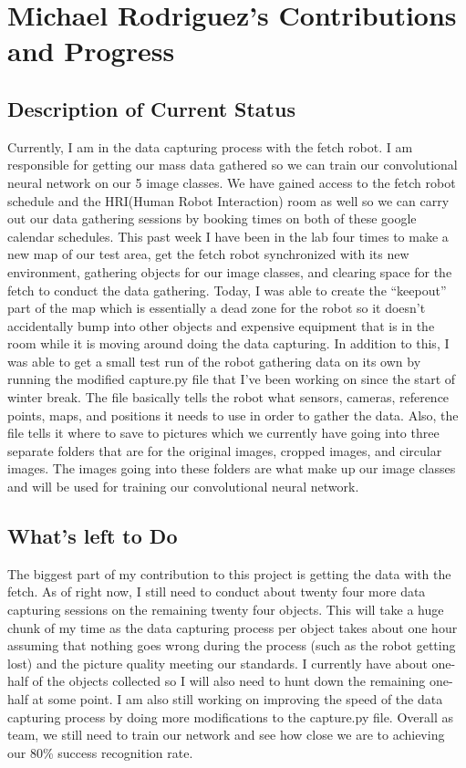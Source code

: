 \documentclass[draftclsnofoot, onecolumn, 10pt, compsoc]{IEEEtran}
\begin{document}
\section{Michael Rodriguez's Contributions and Progress}
\subsection{Description of Current Status}
Currently, I am in the data capturing process with the fetch robot. I am responsible for getting our mass data gathered so we can train our convolutional neural network on our 5 image classes. We have gained access to the fetch robot schedule and the HRI(Human Robot Interaction) room as well so we can carry out our data gathering sessions by booking times on both of these google calendar schedules. This past week I have been in the lab four times to make a new map of our test area, get the fetch robot synchronized with its new environment, gathering objects for our image classes, and clearing space for the fetch to conduct the data gathering. Today, I was able to create the “keepout” part of the map which is essentially a dead zone for the robot so it doesn’t accidentally bump into other objects and expensive equipment that is in the room while it is moving around doing the data capturing. In addition to this, I was able to get a small test run of the robot gathering data on its own by running the modified capture.py file that I’ve been working on since the start of winter break. The file basically tells the robot what sensors, cameras, reference points, maps, and positions it needs to use in order to gather the data. Also, the file tells it where to save to pictures which we currently have going into three separate folders that are for the original images, cropped images, and circular images. The images going into these folders are what make up our image classes and will be used for training our convolutional neural network.
\subsection{What’s left to Do}  
The biggest part of my contribution to this project is getting the data with the fetch. As of right now, I still need to conduct about twenty four more data capturing sessions on the remaining twenty four objects. This will take a huge chunk of my time as the data capturing process per object takes about one hour assuming that nothing goes wrong during the process (such as the robot getting lost) and the picture quality meeting our standards. I currently have about one-half of the objects collected so I will also need to hunt down the remaining one-half at some point. I am also still working on improving the speed of the data capturing process by doing more modifications to the capture.py file. Overall as team, we still need to train our network and see how close we are to achieving our 80\% success recognition rate. 
\end{document}
